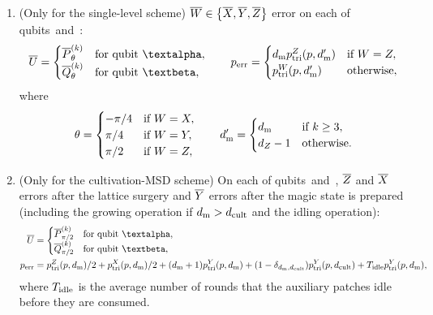 \documentclass[
 prx,
 reprint,
 superscriptaddress,
 longbibliography,
 dvipsnames
]{revtex4-2}
\begin{document}
\begin{widetext}
\begin{enumerate}
    \item (Only for the single-level scheme) $\overline{W} \in \qty{\overline{X}, \overline{Y}, \overline{Z}}$ error on each of qubits~\talpha and~\tbeta:
    \begin{align*}
        \lgc{U} = \begin{cases}
            \rot{\Pstage{k}}{\theta} & \text{for qubit~\talpha}, \\
            \rot{\Qstage{k}}{\theta} & \text{for qubit~\tbeta},
        \end{cases} \qquad
        p_\mr{err} = \begin{cases}
            \dm\plogtri{Z}(p, \dm') & \text{if } W=Z, \\
            \plogtri{W}(p, \dm') & \text{otherwise},
        \end{cases}
    \end{align*}
    where
    \begin{align*}
        \theta = \begin{cases}
            -\pi/4  & \text{if } W = X, \\
            \pi/4 & \text{if } W = Y, \\
            \pi/2 & \text{if } W = Z, \\
        \end{cases} \qquad
        d_{\mathrm{m}}' = \begin{cases}
            d_{\mathrm{m}} & \text{if } k \geq 3, \\
            {d_Z} - 1 & \text{otherwise}.
        \end{cases}
    \end{align*}
    
    \item (Only for the cultivation-MSD scheme) On each of qubits~\talpha and~\tbeta, $\overline{Z}$ and $\overline{X}$ errors after the lattice surgery and $\overline{Y}$ errors after the magic state is prepared (including the growing operation if $d_{\mathrm{m}} > d_\mathrm{cult}$ and the idling operation):
    \begin{align*}
        \lgc{U} &= \begin{cases}
            \rot{\Pstage{k}}{\pi/2} & \text{for qubit~\talpha}, \\
            \rot{\Qstage{k}}{\pi/2} & \text{for qubit~\tbeta},
        \end{cases} \\
        p_\mr{err} &= \plogtri{Z}(p, \dm)/2 + \plogtri{X}(p, \dm)/2 + (\dm + 1)\plogtri{Y}(p, \dm) + (1 - \delta_{\dm, \dcult}) \plogtri{Y}(p, \dcult) + T_\mr{idle} \plogtri{Y}(p, \dm),
    \end{align*}
    where $T_{\mathrm{idle}}$ is the average number of rounds that the auxiliary patches idle before they are consumed.


\end{enumerate}
\end{widetext}
\end{document}
